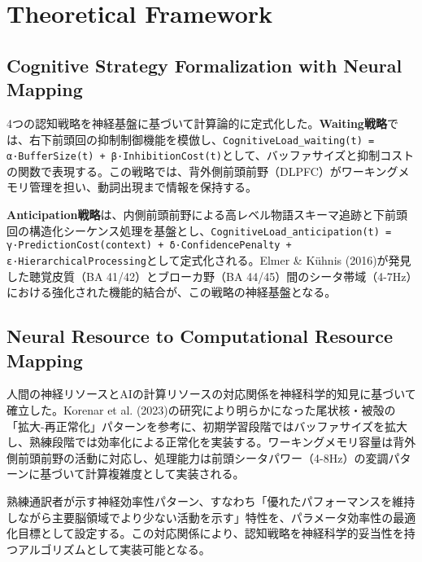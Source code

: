 \section{Theoretical Framework}

\subsection{Cognitive Strategy Formalization with Neural Mapping}

4つの認知戦略を神経基盤に基づいて計算論的に定式化した。\textbf{Waiting戦略}では、右下前頭回の抑制制御機能を模倣し、\texttt{CognitiveLoad\_waiting(t) = α·BufferSize(t) + β·InhibitionCost(t)}として、バッファサイズと抑制コストの関数で表現する。この戦略では、背外側前頭前野（DLPFC）がワーキングメモリ管理を担い、動詞出現まで情報を保持する。

\textbf{Anticipation戦略}は、内側前頭前野による高レベル物語スキーマ追跡と下前頭回の構造化シーケンス処理を基盤とし、\texttt{CognitiveLoad\_anticipation(t) = γ·PredictionCost(context) + δ·ConfidencePenalty + ε·HierarchicalProcessing}として定式化される。Elmer \& Kühnis (2016)が発見した聴覚皮質（BA 41/42）とブローカ野（BA 44/45）間のシータ帯域（4-7Hz）における強化された機能的結合が、この戦略の神経基盤となる。 


\subsection{Neural Resource to Computational Resource Mapping}

人間の神経リソースとAIの計算リソースの対応関係を神経科学的知見に基づいて確立した。Korenar et al. (2023)の研究により明らかになった尾状核・被殻の「拡大-再正常化」パターンを参考に、初期学習段階ではバッファサイズを拡大し、熟練段階では効率化による正常化を実装する。ワーキングメモリ容量は背外側前頭前野の活動に対応し、処理能力は前頭シータパワー（4-8Hz）の変調パターンに基づいて計算複雑度として実装される。

熟練通訳者が示す神経効率性パターン、すなわち「優れたパフォーマンスを維持しながら主要脳領域でより少ない活動を示す」特性を、パラメータ効率性の最適化目標として設定する。この対応関係により、認知戦略を神経科学的妥当性を持つアルゴリズムとして実装可能となる。 

 